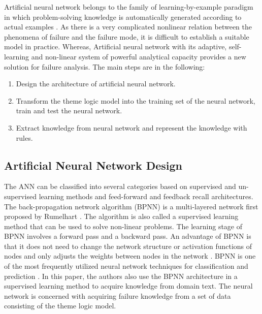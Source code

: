 \documentclass{elsarticle}
\begin{document}
Artificial neural network belongs to the family of learning-by-example
paradigm in which problem-solving knowledge is automatically generated
according to actual examples \cite{hassoun1995fan}. As there is a very
complicated nonlinear relation between the phenomena of failure and
the failure mode, it is difficult to establish a suitable model in
practice. Whereas, Artificial neural network with its adaptive, self-learning
and non-linear system of powerful analytical capacity provides a new
solution for failure analysis. The main steps are in the following:
\begin{enumerate}
\item Design the architecture of artificial neural network.
\item Transform the theme logic model into the training set of the
  neural network, train and test the neural network. 
\item  Extract knowledge from neural network and represent the
knowledge with rules.
\end{enumerate}


\subsection{Artificial Neural Network Design}
\label{sec:artif-neur-netw}

The ANN can be classified into several categories based on supervised
and un-supervised learning methods and feed-forward and feedback
recall architectures. The back-propagation network algorithm (BPNN) is
a multi-layered network first proposed by Rumelhart
\cite{rumelhart1986lir}. The algorithm is also called a supervised
learning method that can be used to solve non-linear problems. The
learning stage of BPNN involves a forward pass and a backward pass. An
advantage of BPNN is that it does not need to change the network
structure or activation functions of nodes and only adjusts the
weights between nodes in the network \cite{Massey2003}. BPNN is one of the most
frequently utilized neural network techniques for classification and
prediction \cite{graupe2007pan}. In this paper, the authors also use the
BPNN architecture in a supervised learning method to acquire knowledge
from domain text. The neural network is concerned with acquiring
failure knowledge from a set of data consisting of the theme logic
model. 
\end{document}
